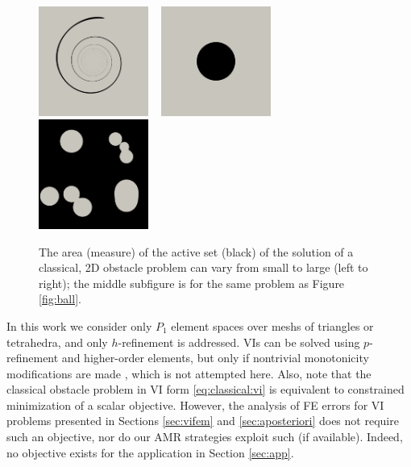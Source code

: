 \documentclass[]{interact}
\theoremstyle{plain}%
\theoremstyle{definition}
\theoremstyle{remark}
\begin{document}
\begin{figure}[ht]
\noindent \hspace{-1mm} \mbox{\includegraphics[width=0.32\textwidth]{static/spiral.png} \,
\includegraphics[width=0.32\textwidth]{static/sphere.png} \,
\includegraphics[width=0.32\textwidth]{static/blisters.png}}
\caption{The area (measure) of the active set (black) of the solution of a classical, 2D obstacle problem can vary from small to large (left to right); the middle subfigure is for the same problem as Figure \ref{fig:ball}.}
\label{fig:activesizes}
\end{figure}

In this work we consider only $P_1$ element spaces over meshs of triangles or tetrahedra, and only $h$-refinement is addressed.  VIs can be solved using $p$-refinement and higher-order elements, but only if nontrivial monotonicity modifications are made \cite{KeithSurowiec2024}, which is not attempted here.  Also, note that the classical obstacle problem in VI form \eqref{eq:classical:vi} is equivalent to constrained minimization of a scalar objective.  However, the analysis of FE errors for VI problems presented in Sections \ref{sec:vifem} and \ref{sec:aposteriori} does not require such an objective, nor do our AMR strategies exploit such (if available).  Indeed, no objective exists for the application in Section \ref{sec:app}.
\end{document}
